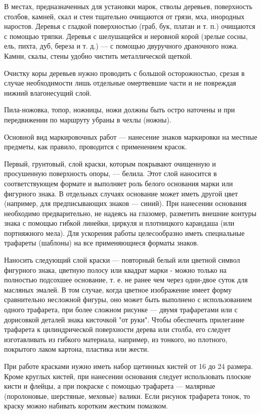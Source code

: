 \documentclass[a4paper,12pt]{extarticle}
\begin{document}
В местах, предназначенных для установки марок, стволы деревьев, поверхность столбов, камней, скал и стен тщательно
очищаются от грязи, мха, инородных наростов. Деревья с гладкой поверхностью (граб, бук, платан и т. п.) очищаются с
помощью тряпки. Деревья с шелушащейся и неровной корой (зрелые сосны, ель, пихта, дуб, береза и т. д.) --- с помощью
двуручного драночного ножа. Камни, скалы, стены удобно чистить металлической щеткой.

Очистку коры деревьев нужно проводить с большой осторожностью, срезая в случае необходимости лишь отдельные омертвевшие
части и не повреждая нижний влагонесущий слой.

Пила-ножовка, топор, ножницы, ножи должны быть остро наточены и при передвижении по маршруту убраны в чехлы (ножны).

Основной вид маркировочных работ --- нанесение знаков маркировки на местные предметы, как правило, проводится с
применением красок.

Первый, грунтовый, слой краски, которым покрывают очищенную и просушенную поверхность опоры, --- белила. Этот слой
наносится в соответствующем формате и выполняет роль белого основания марки или фигурного знака. В отдельных случаях
основание может иметь другой цвет (например, для предписывающих знаков --- синий). При нанесении основания необходимо
предварительно, не надеясь на глазомер, разметить внешние контуры знака с помощью гибкой линейки, циркуля и плотницкого
карандаша (или портняжного мела). Для ускорения работы целесообразно иметь специальные трафареты (шаблоны) на все
применяющиеся форматы знаков.

Наносить следующий слой краски --- повторный белый или цветной символ фигурного знака, цветную полосу или квадрат марки -
можно только на полностью подсохшее основание, т. е. не ранее чем через одни-двое суток для масляных эмалей. В том случае, когда цветное
изображение имеет форму сравнительно несложной фигуры, оно может быть выполнено с использованием одного трафарета, при
более сложном рисунке --- двумя трафаретами или с дорисовкой деталей знака кисточкой "от руки". Чтобы обеспечить
прилегание трафарета к цилиндрической поверхности дерева или столба, его следует изготавливать из гибкого материала,
например, из тонкого, но плотного, покрытого лаком картона, пластика или жести.

При работе красками нужно иметь набор щетинных кистей от 16 до 24 размера. Кроме круглых кистей, при нанесении основания
следует использовать плоские кисти и флейцы, а при покраске с помощью трафарета --- малярные (поролоновые, шерстяные,
меховые) валики. Если рисунок трафарета тонок, то краску можно набивать коротким жестким помазком.
\end{document}
